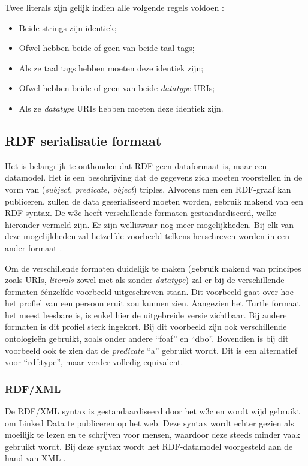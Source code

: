 Twee literals zijn gelijk indien alle volgende regels voldoen \cite{klyne2009resource}:
\begin{itemize}
    \item Beide strings zijn identiek;
    \item Ofwel hebben beide of geen van beide taal tags;
    \item Als ze taal tags hebben moeten deze identiek zijn;
    \item Ofwel hebben beide of geen van beide \textit{datatype} URIs;
    \item Als ze \textit{datatype} URIs hebben moeten deze identiek zijn.
\end{itemize}

\subsection{RDF serialisatie formaat}
\label{subsec:rdf_format}
Het is belangrijk te onthouden dat RDF geen dataformaat is, maar een datamodel. Het is een beschrijving dat de gegevens zich moeten voorstellen in de vorm van (\textit{subject, predicate, object}) triples. Alvorens men een RDF-graaf kan publiceren, zullen de data geserialiseerd moeten worden, gebruik makend van een RDF-syntax. De \acrshort{w3c} heeft verschillende formaten gestandardiseerd, welke hieronder vermeld zijn. Er zijn welliswaar nog meer mogelijkheden. Bij elk van deze mogelijkheden zal hetzelfde voorbeeld telkens herschreven worden in een ander formaat \cite{heath2011linked}.

Om de verschillende formaten duidelijk te maken (gebruik makend van principes zoals URIs, \textit{literals} zowel met als zonder \textit{datatype}) zal er bij de verschillende formaten éénzelfde voorbeeld uitgeschreven staan. Dit voorbeeld gaat over hoe het profiel van een persoon eruit zou kunnen zien. Aangezien het Turtle formaat het meest leesbare is, is enkel hier de uitgebreide versie zichtbaar. Bij andere formaten is dit profiel sterk ingekort. Bij dit voorbeeld zijn ook verschillende ontologieën gebruikt, zoals onder andere ``foaf'' en ``dbo''. Bovendien is bij dit voorbeeld ook te zien dat de \textit{predicate} ``a'' gebruikt wordt. Dit is een alternatief voor ``rdf:type'', maar verder volledig equivalent.

\subsubsection{RDF/XML}
De RDF/XML syntax is gestandaardiseerd door het \acrshort{w3c} en wordt wijd gebruikt om Linked Data te publiceren op het web. Deze syntax wordt echter gezien als moeilijk te lezen en te schrijven voor mensen, waardoor deze steeds minder vaak gebruikt wordt. Bij deze syntax wordt het RDF-datamodel voorgesteld aan de hand van XML \cite{manola2004rdf}.

